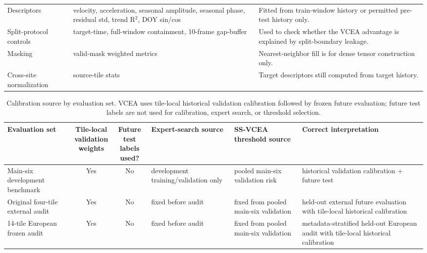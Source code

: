 \documentclass[lettersize,journal]{IEEEtran}
\begin{document}
\begin{table}[!t]
\begin{adjustbox}{max width=\textwidth}
\begin{tabular}{p{}p{}p{}}
    Descriptors & velocity, acceleration, seasonal amplitude, seasonal phase, residual std, trend R$^2$, DOY sin/cos & Fitted from train-window history or permitted pre-test history only. \\
    Split-protocol controls & target-time, full-window containment, 10-frame gap-buffer & Used to check whether the VCEA advantage is explained by split-boundary leakage. \\
    Masking & valid-mask weighted metrics & Nearest-neighbor fill is for dense tensor construction only. \\
    Cross-site normalization & source-tile stats & Target descriptors still computed from target history. \\
    \bottomrule
  \end{tabular}
  \end{adjustbox}
\end{table}

\begin{table}[!t]
  \centering
  \caption{Calibration source by evaluation set. VCEA uses tile-local historical validation calibration followed by frozen future evaluation; future test labels are not used for calibration, expert search, or threshold selection.}
  \label{tab:calibration_source_by_set}
  \scriptsize
  \begin{adjustbox}{max width=\textwidth}
  \begin{tabular}{p{}ccp{}p{}p{}}
    \toprule
    Evaluation set & \shortstack{Tile-local\\validation\\weights} & \shortstack{Future\\test\\labels used?} & Expert-search source & SS-VCEA threshold source & Correct interpretation \\
    \midrule
    Main-six development benchmark & Yes & No & development training/validation only & pooled main-six validation risk & historical validation calibration + future test \\
    Original four-tile external audit & Yes & No & fixed before audit & fixed from pooled main-six validation & held-out external future evaluation with tile-local historical calibration \\
    14-tile European frozen audit & Yes & No & fixed before audit & fixed from pooled main-six validation & metadata-stratified held-out European audit with tile-local historical calibration \\
    \bottomrule
  \end{tabular}
  \end{adjustbox}
\end{table}
\end{document}
